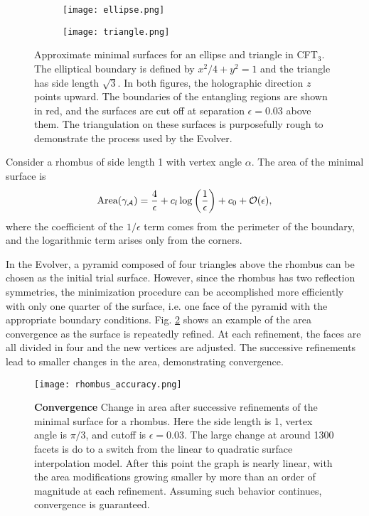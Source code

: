 \documentclass[11 pt]{article}
\begin{document}
\begin{figure}
     \centering
     \begin{subfigure}[h!]{0.38\textwidth}
         \centering
         \texttt{[image: ellipse.png]}
     \end{subfigure}
     \qquad
     \begin{subfigure}[h!]{0.38\textwidth}
         \centering
         \texttt{[image: triangle.png]}
     \end{subfigure}
        \caption{Approximate minimal surfaces for an ellipse and triangle in CFT$_3$. The elliptical boundary is defined by $x^2/4+y^2 = 1$ and the triangle has side length $\sqrt{3}$. In both figures, the holographic direction $z$ points upward. The boundaries of the entangling regions are shown in red, and the surfaces are cut off at separation $\epsilon=0.03$ above them. The triangulation on these surfaces is purposefully rough to demonstrate the process used by the Evolver.}
        \label{fig:CFT3_examples}
\end{figure}
Consider a rhombus of side length 1 with vertex angle $\alpha$. The area of the minimal surface is
\begin{equation}\label{rhombus_expansion}
    \text{Area}(\gamma_{\cal A}) = \frac{4}{\epsilon} + c_l\log\left(\frac{1}{\epsilon}\right) + c_0 + \mathcal{O}(\epsilon),
\end{equation}
where the coefficient of the $1/\epsilon$ term comes from the perimeter of the boundary, and the logarithmic term arises only from the corners.

In the Evolver, a pyramid composed of four triangles above the rhombus can be chosen as the initial trial surface. However, since the rhombus has two reflection symmetries, the minimization procedure can be accomplished more efficiently with only one quarter of the surface, i.e. one face of the pyramid with the appropriate boundary conditions. Fig. \ref{fig:rhombus_accuracy} shows an example of the area convergence as the surface is repeatedly refined. At each refinement, the faces are all divided in four and the new vertices are adjusted. The successive refinements lead to smaller changes in the area, demonstrating convergence.

\begin{figure}[h!]
    \centering
    \texttt{[image: rhombus\_accuracy.png]}
    \caption{{\bf Convergence} Change in area after successive refinements of the minimal surface for a rhombus. Here the side length is 1, vertex angle is $\pi/3$, and cutoff is $\epsilon=0.03$. The large change at around 1300 facets is do to a switch from the linear to quadratic surface interpolation model. After this point the graph is nearly linear, with the area modifications growing smaller by more than an order of magnitude at each refinement. Assuming such behavior continues, convergence is guaranteed.}
    \label{fig:rhombus_accuracy}
\end{figure}
\end{document}
